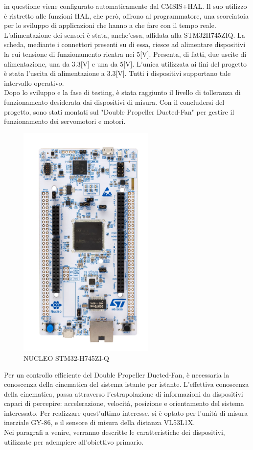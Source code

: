 \documentclass[11pt]{report}
\begin{document}
in questione viene configurato automaticamente dal CMSIS+HAL. Il suo utilizzo è ristretto alle funzioni HAL, che però, offrono al programmatore, una scorciatoia per lo sviluppo di applicazioni che hanno a che fare con il tempo reale.\\
L'alimentazione dei sensori è stata, anche'essa, affidata alla STM32H745ZIQ. La scheda, mediante i connettori presenti su di essa, riesce ad alimentare dispositivi la cui tensione di funzionamento rientra nei 5[V]. Presenta, di fatti, due uscite di alimentazione, una da 3.3[V] e una da 5[V]. L'unica utilizzata ai fini del progetto è stata l'uscita di alimentazione a 3.3[V]. Tutti i dispositivi supportano tale intervallo operativo.\\
Dopo lo sviluppo e la fase di testing, è stata raggiunto il livello di tolleranza di funzionamento desiderata dai dispositivi di misura. Con il concludersi del progetto, sono stati montati sul "Double Propeller Ducted-Fan" per gestire il funzionamento dei servomotori e motori.
 
\begin{figure}[H]
    \centering
    \includegraphics[width = 0.6\textwidth]{images/Immagine_1_relazione__IMMAGINE_STM32H745ZIQ.jpg}
    \caption{NUCLEO STM32-H745ZI-Q}
    \label{fig:etichetta}
\end{figure}
Per un controllo efficiente del Double Propeller Ducted-Fan, è necessaria la conoscenza della cinematica del sistema istante per istante.
L'effettiva conoscenza della cinematica, passa attraverso l'estrapolazione di informazioni da dispositivi capaci di percepire: accelerazione, velocità, posizione e orientamento del sistema interessato.
Per realizzare quest'ultimo interesse, si è optato per l'unità di misura inerziale GY-86, e il sensore di misura della distanza VL53L1X.\\
Nei paragrafi a venire, verranno descritte le caratteristiche dei dispositivi, utilizzate per adempiere all'obiettivo primario.
\end{document}
